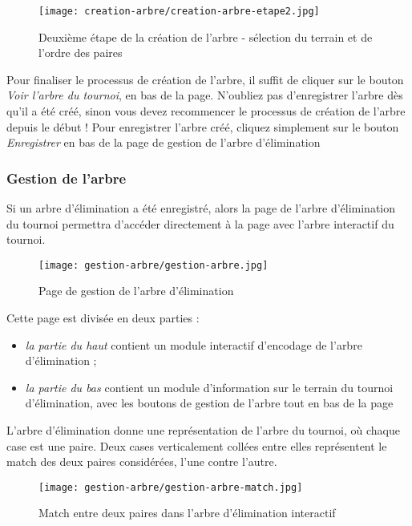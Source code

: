 \begin{figure}[H]
\centering
\texttt{[image: creation-arbre/creation-arbre-etape2.jpg]}
\caption{Deuxième étape de la création de l'arbre - sélection du terrain et de l'ordre des paires}
\end{figure}

Pour finaliser le processus de création de l'arbre, il suffit de cliquer sur le bouton \textit{Voir l'arbre du tournoi}, en bas de la page. N'oubliez pas d'enregistrer l'arbre dès qu'il a été créé, sinon vous devez recommencer le processus de création de l'arbre depuis le début ! Pour enregistrer l'arbre créé, cliquez simplement sur le bouton \textit{Enregistrer} en bas de la page de gestion de l'arbre d'élimination


\subsubsection{Gestion de l'arbre}

Si un arbre d'élimination a été enregistré, alors la page de l'arbre d'élimination du tournoi permettra d'accéder directement à la page avec l'arbre interactif du tournoi.

\begin{figure}[H]
\centering
\texttt{[image: gestion-arbre/gestion-arbre.jpg]}
\caption{Page de gestion de l'arbre d'élimination}
\end{figure}

Cette page est divisée en deux parties :

\begin{itemize}
\item \textit{la partie du haut} contient un module interactif d'encodage de l'arbre d'élimination ;
\item \textit{la partie du bas} contient un module d'information sur le terrain du tournoi d'élimination, avec les boutons de gestion de l'arbre tout en bas de la page
\end{itemize}
\bigskip

L'arbre d'élimination donne une représentation de l'arbre du tournoi, où chaque case est une paire. Deux cases verticalement collées entre elles représentent le match des deux paires considérées, l'une contre l'autre.

\begin{figure}[H]
\centering
\texttt{[image: gestion-arbre/gestion-arbre-match.jpg]}
\caption{Match entre deux paires dans l'arbre d'élimination interactif}
\end{figure}

